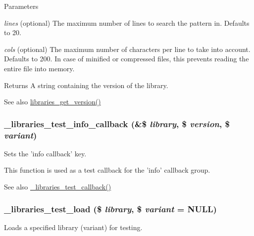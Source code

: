 \begin{DoxyParams}{Parameters}
\item[{\em lines}](optional) The maximum number of lines to search the pattern in. Defaults to 20. \item[{\em cols}](optional) The maximum number of characters per line to take into account. Defaults to 200. In case of minified or compressed files, this prevents reading the entire file into memory.\end{DoxyParams}
\begin{DoxyReturn}{Returns}
A string containing the version of the library.
\end{DoxyReturn}
\begin{DoxySeeAlso}{See also}
\hyperlink{libraries_8module_a75db4e86addc3ceb4df8d0e1f5a54f99}{libraries\_\-get\_\-version()} 
\end{DoxySeeAlso}
\hypertarget{libraries__test_8module_accd1b2af2131239fc9a0ec8acd69590a}{
\subsubsection[{\_\-libraries\_\-test\_\-info\_\-callback}]{\setlength{\rightskip}{0pt plus 5cm}\_\-libraries\_\-test\_\-info\_\-callback (\&\$ {\em library}, \/  \$ {\em version}, \/  \$ {\em variant})}}
\label{libraries__test_8module_accd1b2af2131239fc9a0ec8acd69590a}
Sets the 'info callback' key.

This function is used as a test callback for the 'info' callback group.

\begin{DoxySeeAlso}{See also}
\hyperlink{libraries__test_8module_a4ecb0be495ba6a434403bc89961cbb8d}{\_\-libraries\_\-test\_\-callback()} 
\end{DoxySeeAlso}
\hypertarget{libraries__test_8module_acd62f5a0e48ea74be7d66de8f440da6e}{
\subsubsection[{\_\-libraries\_\-test\_\-load}]{\setlength{\rightskip}{0pt plus 5cm}\_\-libraries\_\-test\_\-load (\$ {\em library}, \/  \$ {\em variant} = {\ttfamily NULL})}}
\label{libraries__test_8module_acd62f5a0e48ea74be7d66de8f440da6e}
Loads a specified library (variant) for testing.

